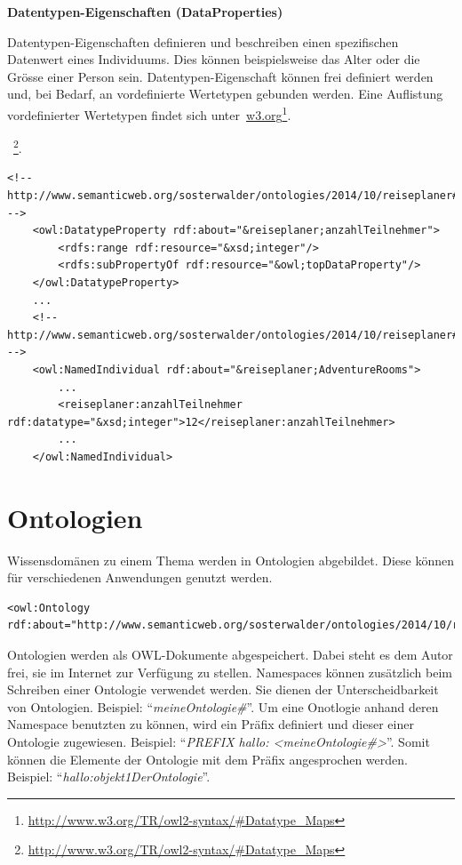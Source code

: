 \textbf{Datentypen-Eigenschaften (DataProperties)}

Datentypen-Eigenschaften definieren und beschreiben einen spezifischen Datenwert eines Individuums. Dies können beispielsweise das Alter oder die Grösse einer Person sein. Datentypen-Eigenschaft können frei definiert werden und, bei Bedarf, an vordefinierte Wertetypen gebunden werden. Eine Auflistung vordefinierter Wertetypen findet sich unter~\href{http://www.w3.org/TR/owl2-syntax/\#Datatype_Maps}{w3.org}\footnote{\url{http://www.w3.org/TR/owl2-syntax/\#Datatype_Maps}}.


~\footnote{\url{http://www.w3.org/TR/owl2-syntax/\#Datatype_Maps}}.

\begin{lstlisting}[caption={Beispiel der Datentypen-Eigenschaft \textit{anzahlTeilnehmer} und deren Anwendung bei einem Individuum}]
    <!-- http://www.semanticweb.org/sosterwalder/ontologies/2014/10/reiseplaner#anzahlTeilnehmer -->
    <owl:DatatypeProperty rdf:about="&reiseplaner;anzahlTeilnehmer">
        <rdfs:range rdf:resource="&xsd;integer"/>
        <rdfs:subPropertyOf rdf:resource="&owl;topDataProperty"/>
    </owl:DatatypeProperty>
    ...
    <!-- http://www.semanticweb.org/sosterwalder/ontologies/2014/10/reiseplaner#AdventureRooms -->
    <owl:NamedIndividual rdf:about="&reiseplaner;AdventureRooms">
        ...
        <reiseplaner:anzahlTeilnehmer rdf:datatype="&xsd;integer">12</reiseplaner:anzahlTeilnehmer>
        ...
    </owl:NamedIndividual>
\end{lstlisting}

\newpage

\section{Ontologien}
\label{sec:owl_owl_Ontologien}

Wissensdomänen zu einem Thema werden in Ontologien abgebildet. Diese können für verschiedenen Anwendungen genutzt werden.

\begin{lstlisting}[caption={Beispiel einer Definition einer Ontologie}]
    <owl:Ontology rdf:about="http://www.semanticweb.org/sosterwalder/ontologies/2014/10/reiseplaner"/>
\end{lstlisting}

Ontologien werden als OWL-Dokumente abgespeichert. Dabei steht es dem Autor frei, sie im Internet zur Verfügung zu stellen.
Namespaces können zusätzlich beim Schreiben einer Ontologie verwendet werden. Sie dienen der Unterscheidbarkeit von Ontologien. Beispiel: ``\textit{meineOntologie\#}''. Um eine Onotlogie anhand deren Namespace benutzten zu können, wird ein Präfix definiert und dieser einer Ontologie zugewiesen. Beispiel: ``\textit{PREFIX hallo: <meineOntologie\#>}''. Somit können die Elemente der Ontologie mit dem Präfix angesprochen werden. Beispiel: ``\textit{hallo:objekt1DerOntologie}''.

